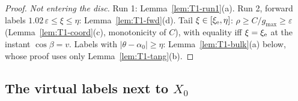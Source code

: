 \begin{proof}
\emph{Not entering the disc.} Run 1: Lemma~\ref{lem:T1-run1}(a). Run 2, forward labels $1.02\,\varepsilon\le\xi\le\eta$:
Lemma~\ref{lem:T1-fwd}(d). Tail $\xi\in[\xi_{\mathrm e},\eta]$: $\rho\ge C/g_{\max}\ge\varepsilon$ (Lemma~\ref{lem:T1-coord}(c), monotonicity of
$C$), with equality iff $\xi=\xi_{\mathrm e}$ at the instant $\cos\beta=v$. Labels with $|\theta-\alpha_0|\ge\eta$: Lemma~\ref{lem:T1-bulk}(a)
below, whose proof uses only Lemma~\ref{lem:T1-tang}(b).
\end{proof}

\subsection{The virtual labels next to \texorpdfstring{$X_0$}{X0}}\label{sec:T1-virt}

